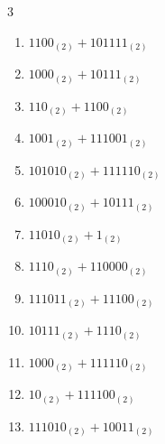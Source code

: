 \begin{multicols}{3}
\begin{enumerate}

  \item $1100_{(2)} + 101111_{(2)}$


  \item $1000_{(2)} + 10111_{(2)}$


  \item $110_{(2)} + 1100_{(2)}$


  \item $1001_{(2)} + 111001_{(2)}$


  \item $101010_{(2)} + 111110_{(2)}$


  \item $100010_{(2)} + 10111_{(2)}$


  \item $11010_{(2)} + 1_{(2)}$


  \item $1110_{(2)} + 110000_{(2)}$


  \item $111011_{(2)} + 11100_{(2)}$


\columnbreak %

  \item $10111_{(2)} + 1110_{(2)}$


  \item $1000_{(2)} + 111110_{(2)}$


  \item $10_{(2)} + 111100_{(2)}$


  \item $111010_{(2)} + 10011_{(2)}$



\end{enumerate}
\end{multicols}
